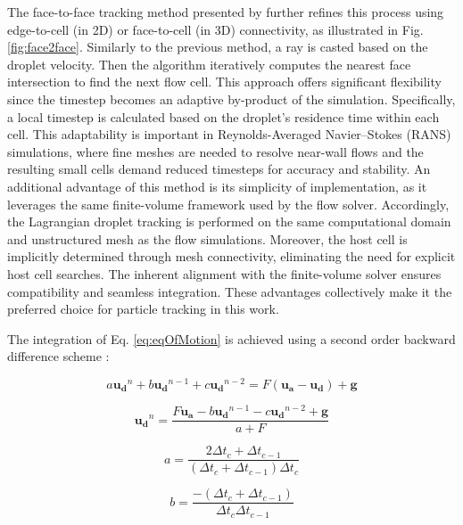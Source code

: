 The face-to-face tracking method presented by \cite{rendall2014finite} further refines this process using edge-to-cell (in 2D) or face-to-cell (in 3D) connectivity, as illustrated in Fig. \ref{fig:face2face}. Similarly to the previous method, a ray is casted based on the droplet velocity. Then the algorithm iteratively computes the nearest face intersection to find the next flow cell. This approach offers significant flexibility since the timestep becomes an adaptive by-product of the simulation. Specifically, a local timestep is calculated based on the droplet's residence time within each cell. This adaptability is important in Reynolds-Averaged Navier–Stokes (RANS) simulations, where fine meshes are needed to resolve near-wall flows and the resulting small cells demand reduced timesteps for accuracy and stability. An additional advantage of this method is its simplicity of implementation, as it leverages the same finite-volume framework used by the flow solver. Accordingly, the Lagrangian droplet tracking is performed on the same computational domain and unstructured mesh as the flow simulations. Moreover, the host cell is implicitly determined through mesh connectivity, eliminating the need for explicit host cell searches. The inherent alignment with the finite-volume solver ensures compatibility and seamless integration. These advantages collectively make it the preferred choice for particle tracking in this work.

The integration of Eq. \ref{eq:eqOfMotion} is achieved using a second order backward difference scheme \cite{rendall2014finite}:


\begin{equation}
a \boldsymbol{u_d}^n + b \boldsymbol{u_d}^{n-1} + c \boldsymbol{u_d}^{n-2} = F (\boldsymbol{u_a}-\boldsymbol{u_d}) + \textbf{g}
\label{eq:BDF1}
\end{equation}


\begin{equation}
 \boldsymbol{u_d}^{n} = \frac{F \boldsymbol{u_a} - b \boldsymbol{u_d}^{n-1}  - c \boldsymbol{u_d}^{n-2} +\textbf{g}}{a + F}
\label{eq:BDF2_Time}
\end{equation}

\begin{equation}
a = \frac{2\Delta t_c+\Delta t_{c-1}}{(\Delta t_c+\Delta t_{c-1})\Delta t_c}
\label{eq:alpha}
\end{equation}

\begin{equation}
b = \frac{-(\Delta t_c+\Delta t_{c-1})}{\Delta t_c\Delta t_{c-1}}
\label{eq:beta}
\end{equation}

